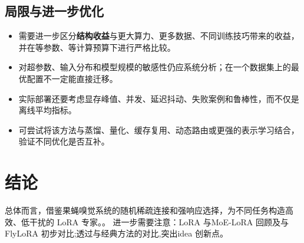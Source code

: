 \documentclass[UTF8,11pt,a4paper]{ctexart}
\newcommand{\term}[1]{\textbf{\textcolor{mainblue}{#1}}}
\begin{document}
\subsection{局限与进一步优化}
\begin{itemize}
\item 需要进一步区分\term{结构收益}与更大算力、更多数据、不同训练技巧带来的收益，并在等参数、等计算预算下进行严格比较。
\item 对超参数、输入分布和模型规模的敏感性仍应系统分析；在一个数据集上的最优配置不一定能直接迁移。
\item 实际部署还要考虑显存峰值、并发、延迟抖动、失败案例和鲁棒性，而不仅是离线平均指标。
\item 可尝试将该方法与蒸馏、量化、缓存复用、动态路由或更强的表示学习结合，验证不同优化是否互补。
\end{itemize}

\section{结论}
总体而言，借鉴果蝇嗅觉系统的随机稀疏连接和强响应选择，为不同任务构造高效、低干扰的 LoRA 专家。。 进一步需要注意：LoRA 与MoE-LoRA 回顾及与FlyLoRA 初步对比;透过与经典方法的对比,突出idea 创新点。
\end{document}
